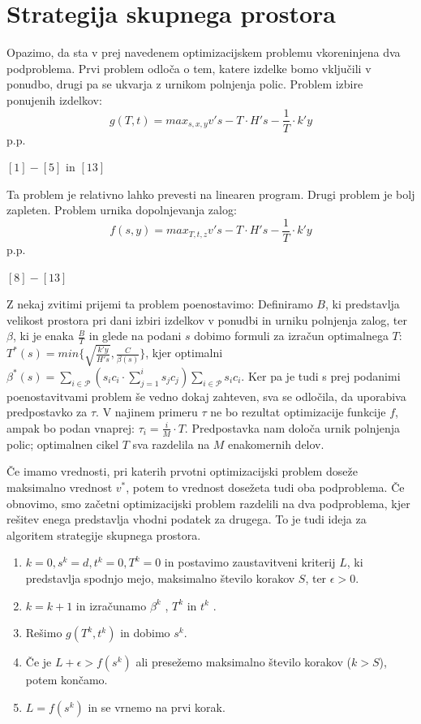 \documentclass[a4paper]{article}
\begin{document}
\pagebreak
\section{Strategija skupnega prostora}

Opazimo, da sta v prej navedenem optimizacijskem problemu vkoreninjena dva podproblema. Prvi problem odloča o tem, katere izdelke bomo vključili v ponudbo, drugi pa se ukvarja z urnikom polnjenja polic. 
Problem izbire ponujenih izdelkov:
$$g(T, t) = max_{s, x, y}  v' s - T \cdot H' s - \frac{1}{T} \cdot k' y $$
p.p.

$[1] - [5]$ in $[13]$

\vspace*{3 mm}

Ta problem je relativno lahko prevesti na linearen program. Drugi problem je bolj zapleten. 
Problem urnika dopolnjevanja zalog:
$$f(s, y) = max_{T, t, z}  v' s - T \cdot H' s - \frac{1}{T} \cdot k' y $$
p.p.

$[8] - [13]$

\vspace*{3 mm}

Z nekaj zvitimi prijemi ta problem poenostavimo: Definiramo $B$, ki predstavlja velikost prostora pri dani izbiri izdelkov v ponudbi in urniku polnjenja zalog, ter $\beta$, ki je enaka $\frac{B}{T}$ in glede na podani $s$ dobimo formuli za izračun optimalnega $T$: 
$T^{*} (s) = min\{\sqrt{\frac{k' y}{H' s}}, \frac{C}{\beta(s)}  \}$, kjer optimalni $\beta^*  (s) = \sum_{i \in \mathcal{P}} (s_i c_i \cdot \sum_{j = 1}^{i} s_j c_j) \sum_{i \in \mathcal{P}} s_i c_i $. Ker pa je tudi s prej podanimi poenostavitvami problem še vedno dokaj zahteven, sva se odločila, da uporabiva predpostavko za $\tau$. V najinem primeru $\tau$ ne bo rezultat optimizacije funkcije $f$, ampak bo podan vnaprej: $\tau_i = \frac{i}{M}\cdot T$. Predpostavka nam določa urnik polnjenja polic; optimalnen cikel $T$ sva razdelila na $M$ enakomernih delov. 

\vspace*{1 mm}
Če imamo vrednosti, pri katerih prvotni optimizacijski problem doseže maksimalno vrednost $v ^ *$, potem to vrednost dosežeta tudi oba podproblema. Če obnovimo, smo začetni optimizacijski problem razdelili na dva podproblema, kjer rešitev enega predstavlja vhodni podatek za drugega. To je tudi ideja za algoritem strategije skupnega prostora.

\begin{enumerate}
\item $k = 0, s^k = d, t^k = 0, T^k = 0$ in postavimo zaustavitveni kriterij $L$, ki predstavlja spodnjo mejo, maksimalno število korakov $S$, ter $\epsilon > 0$.
\item $k = k+1$ in izračunamo  $\beta^k$ , $T^k$ in $t^k$ .
\item Rešimo $g(T^k, t^k)$ in dobimo $s^k$.
\item Če je $L  + \epsilon> f(s^k)$ ali  presežemo maksimalno število korakov ($k > S$), potem končamo.
\item $L = f(s^k)$ in se vrnemo na prvi korak.
\end{enumerate}
\end{document}
